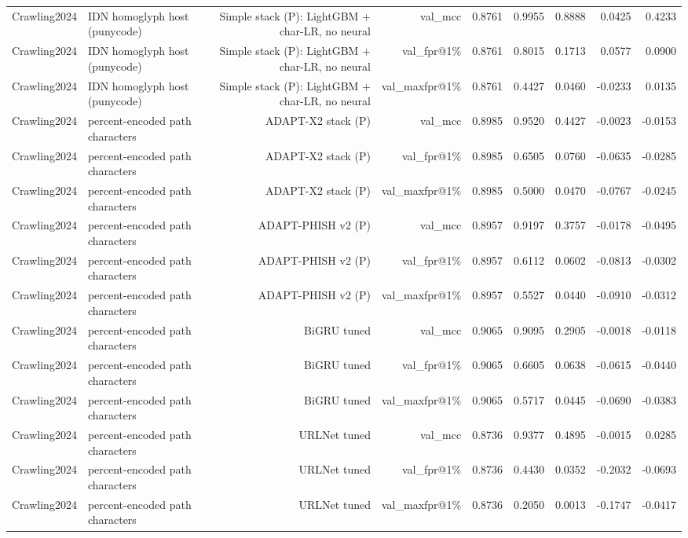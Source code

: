 \begin{table}[t]
\begin{tabular}{llrrrrrrr}
Crawling2024 & IDN homoglyph host (punycode) & Simple stack (P): LightGBM + char-LR, no neural & val\_mcc & 0.8761 & 0.9955 & 0.8888 & 0.0425 & 0.4233 \\
Crawling2024 & IDN homoglyph host (punycode) & Simple stack (P): LightGBM + char-LR, no neural & val\_fpr@1\% & 0.8761 & 0.8015 & 0.1713 & 0.0577 & 0.0900 \\
Crawling2024 & IDN homoglyph host (punycode) & Simple stack (P): LightGBM + char-LR, no neural & val\_maxfpr@1\% & 0.8761 & 0.4427 & 0.0460 & -0.0233 & 0.0135 \\
Crawling2024 & percent-encoded path characters & ADAPT-X2 stack (P) & val\_mcc & 0.8985 & 0.9520 & 0.4427 & -0.0023 & -0.0153 \\
Crawling2024 & percent-encoded path characters & ADAPT-X2 stack (P) & val\_fpr@1\% & 0.8985 & 0.6505 & 0.0760 & -0.0635 & -0.0285 \\
Crawling2024 & percent-encoded path characters & ADAPT-X2 stack (P) & val\_maxfpr@1\% & 0.8985 & 0.5000 & 0.0470 & -0.0767 & -0.0245 \\
Crawling2024 & percent-encoded path characters & ADAPT-PHISH v2 (P) & val\_mcc & 0.8957 & 0.9197 & 0.3757 & -0.0178 & -0.0495 \\
Crawling2024 & percent-encoded path characters & ADAPT-PHISH v2 (P) & val\_fpr@1\% & 0.8957 & 0.6112 & 0.0602 & -0.0813 & -0.0302 \\
Crawling2024 & percent-encoded path characters & ADAPT-PHISH v2 (P) & val\_maxfpr@1\% & 0.8957 & 0.5527 & 0.0440 & -0.0910 & -0.0312 \\
Crawling2024 & percent-encoded path characters & BiGRU tuned & val\_mcc & 0.9065 & 0.9095 & 0.2905 & -0.0018 & -0.0118 \\
Crawling2024 & percent-encoded path characters & BiGRU tuned & val\_fpr@1\% & 0.9065 & 0.6605 & 0.0638 & -0.0615 & -0.0440 \\
Crawling2024 & percent-encoded path characters & BiGRU tuned & val\_maxfpr@1\% & 0.9065 & 0.5717 & 0.0445 & -0.0690 & -0.0383 \\
Crawling2024 & percent-encoded path characters & URLNet tuned & val\_mcc & 0.8736 & 0.9377 & 0.4895 & -0.0015 & 0.0285 \\
Crawling2024 & percent-encoded path characters & URLNet tuned & val\_fpr@1\% & 0.8736 & 0.4430 & 0.0352 & -0.2032 & -0.0693 \\
Crawling2024 & percent-encoded path characters & URLNet tuned & val\_maxfpr@1\% & 0.8736 & 0.2050 & 0.0013 & -0.1747 & -0.0417 \\

\end{tabular}
\end{table}
